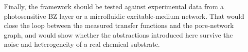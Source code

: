 Finally, the framework should be tested against experimental data from a photosensitive BZ layer or a microfluidic excitable-medium network.
That would close the loop between the measured transfer functions and the pore-network graph, and would show whether the abstractions introduced here survive the noise and heterogeneity of a real chemical substrate.
